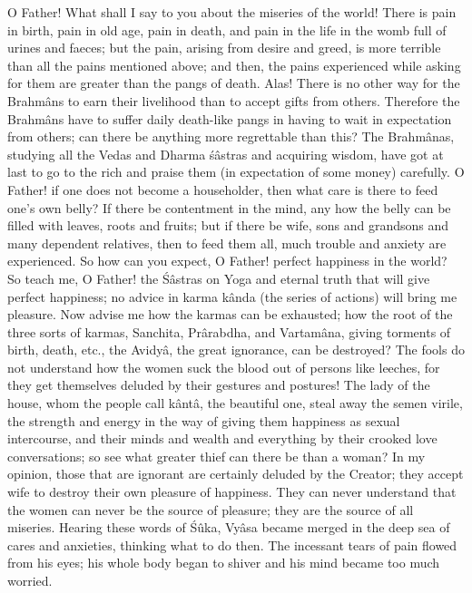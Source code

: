 O Father! What shall I say to you about the miseries of the world! There is pain in birth, pain in old age, pain in death, and pain in the life in the womb full of urines and faeces; but the pain, arising from desire and greed, is more terrible than all the pains mentioned above; and then, the pains experienced while asking for them are greater than the pangs of death. Alas! There is no other way for the Brahm\^ans to earn their livelihood than to accept gifts from others. Therefore the Brahm\^ans have to suffer daily death-like pangs in having to wait in expectation from others; can there be anything more regrettable than this? The Brahm\^anas, studying all the Vedas and Dharma \'s\^astras and acquiring wisdom, have got at last to go to the rich and praise them (in expectation of some money) carefully. O Father! if one does not become a householder, then what care is there to feed one's own belly? If there be contentment in the mind, any how the belly can be filled with leaves, roots and fruits; but if there be wife, sons and grandsons and many dependent relatives, then to feed them all, much trouble and anxiety are experienced. So how can you expect, O Father! perfect happiness in the world? So teach me, O Father! the \'S\^astras on Yoga and eternal truth that will give perfect happiness; no advice in karma k\^anda (the series of actions) will bring me pleasure. Now advise me how the karmas can be exhausted; how the root of the three sorts of karmas, Sanchita, Pr\^arabdha, and Vartam\^ana, giving torments of birth, death, etc., the Avidy\^a, the great ignorance, can be destroyed? The fools do not understand how the women suck the blood out of persons like leeches, for they get themselves deluded by their gestures and postures! The lady of the house, whom the people call k\^ant\^a, the beautiful one, steal away the semen virile, the strength and energy in the way of giving them happiness as sexual intercourse, and their minds and wealth and everything by their crooked love conversations; so see what greater thief can there be than a woman? In my opinion, those that are ignorant are certainly deluded by the Creator; they accept wife to destroy their own pleasure of happiness. They can never understand that the women can never be the source of pleasure; they are the source of all miseries. Hearing these words of \'S\^uka, Vy\^asa became merged in the deep sea of cares and anxieties, thinking what to do then. The incessant tears of pain flowed from his eyes; his whole body began to shiver and his mind became too much worried.

